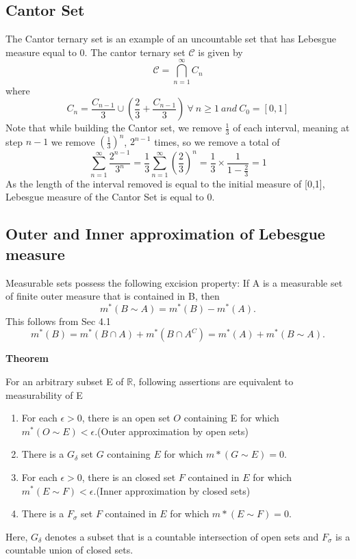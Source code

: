 \documentclass{article}
\begin{document}
\subsection{Cantor Set}
The Cantor ternary set is an example of an uncountable set that has Lebesgue measure equal to 0. The cantor ternary set $\mathcal{C}$ is given by
	$$\mathcal{C} = \bigcap\limits_{n=1}^\infty C_n$$
	where
	$$C_n = \frac{C_{n-1}}{3} \cup ( \frac{2}{3} + \frac{C_{n-1}}{3} ) \  \forall\ n \geq 1 \ and\ C_0 =  [0, 1]$$
	Note that while building the Cantor set, we remove $\frac{1}{3}$ of each interval, meaning at step $n-1$ we remove $(\frac{1}{3})^n$, $2^{n-1}$ times, so we remove a total of
	$$ \sum_{n=1}^{\infty} \frac{2^{n-1}}{3^n}=\frac{1}{3}\sum_{n=1}^{\infty} (\frac{2}{3})^n=\frac{1}{3}\times \frac{1}{1-\frac{2}{3}}=1$$
	As the length of the interval removed is equal to the initial measure of [0,1], Lebesgue measure of the Cantor Set is equal to 0.
\subsection{Outer and Inner approximation of Lebesgue measure}

Measurable sets possess the following excision property: If A is a measurable set of finite outer measure that is contained in B, then
$$ m^*(B \sim A)= m^*(B)-m^*(A).$$
This follows from Sec 4.1
$$m^*(B)=m^*(B \cap A) + m^*(B \cap A^C)= m^*(A)+  m^*(B \sim A).$$

{\large \textbf{Theorem}}

For an arbitrary subset E of $\mathbb{R}$, following assertions are equivalent to measurability of E

\begin{enumerate}

    \item For each $\epsilon >0$, there is an open set $O$ containing E for which $m^{*}(O \sim E)<\epsilon$.(Outer approximation by open sets)
    \item There is a $G_{\delta}$ set $G$ containing $E$ for which $m*(G \sim E) =0$. 
    
    \item For each $\epsilon >0$, there is an closed set $F$ contained in $E$ for which $m^{*}(E \sim F)<\epsilon$.(Inner approximation by closed sets)
    \item There is a $F_{\sigma}$ set $F$ contained in $E$ for which $m*(E \sim F) =0$. 
\end{enumerate}

Here, $G_{\delta}$ denotes a subset that is a countable intersection of open sets and $F_{\sigma}$ is a countable union of closed sets.
\end{document}
